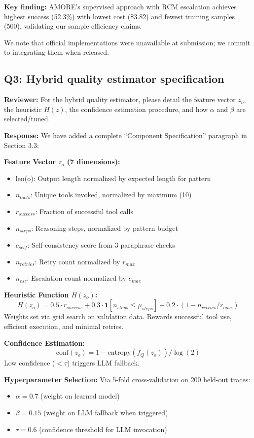 \documentclass[11pt]{article}
\newcommand{\reviewer}[1]{\textcolor{reviewerblue}{\textbf{Reviewer:} #1}}
\newcommand{\response}[1]{\textcolor{responsegreen}{\textbf{Response:} #1}}
\begin{document}
\textbf{Key finding:} AMORE's supervised approach with RCM escalation achieves highest success (52.3\%) with lowest cost (\$3.82) and fewest training samples (500), validating our sample efficiency claims.

We note that official implementations were unavailable at submission; we commit to integrating them when released.

\subsection*{Q3: Hybrid quality estimator specification}

\reviewer{For the hybrid quality estimator, please detail the feature vector $z_o$, the heuristic $H(z)$, the confidence estimation procedure, and how $\alpha$ and $\beta$ are selected/tuned.}

\response{We have added a complete ``Component Specification'' paragraph in Section 3.3:}

\textbf{Feature Vector $z_o$ (7 dimensions):}
\begin{itemize}[leftmargin=*,nosep]
    \item len(o): Output length normalized by expected length for pattern
    \item $n_{tools}$: Unique tools invoked, normalized by maximum (10)
    \item $r_{success}$: Fraction of successful tool calls
    \item $n_{steps}$: Reasoning steps, normalized by pattern budget
    \item $c_{self}$: Self-consistency score from 3 paraphrase checks
    \item $n_{retries}$: Retry count normalized by $r_{max}$
    \item $n_{esc}$: Escalation count normalized by $e_{max}$
\end{itemize}

\textbf{Heuristic Function $H(z_o)$:}
\[
H(z_o) = 0.5 \cdot r_{success} + 0.3 \cdot \mathbf{1}[n_{steps} \leq \mu_{steps}] + 0.2 \cdot (1 - n_{retries}/r_{max})
\]
Weights set via grid search on validation data. Rewards successful tool use, efficient execution, and minimal retries.

\textbf{Confidence Estimation:}
\[
\text{conf}(z_o) = 1 - \text{entropy}(f_Q(z_o)) / \log(2)
\]
Low confidence ($< \tau$) triggers LLM fallback.

\textbf{Hyperparameter Selection:} Via 5-fold cross-validation on 200 held-out traces:
\begin{itemize}[leftmargin=*,nosep]
    \item $\alpha = 0.7$ (weight on learned model)
    \item $\beta = 0.15$ (weight on LLM fallback when triggered)
    \item $\tau = 0.6$ (confidence threshold for LLM invocation)
\end{itemize}
\end{document}
